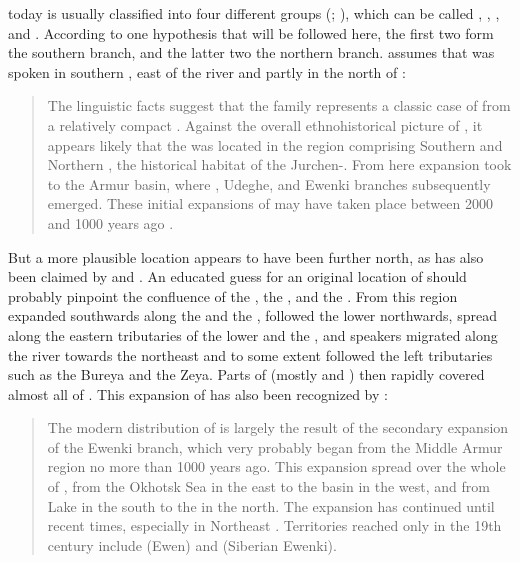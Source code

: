  today is usually classified into four different groups (\citealt{Ikegami1974}; \citealt{Georg2004}), which can be called , , , and  \citep{Janhunen2012b}. According to one hypothesis that will be followed here, the first two form the southern  branch, and the latter two the northern branch. \cite{Janhunen1996,Janhunen2005,Janhunen2012b} assumes that  was spoken in southern , east of the  river and partly in the north of :

\begin{quote}
The linguistic facts suggest that the  family represents a classic case of  from a relatively compact . Against the overall ethnohistorical picture of , it appears likely that the   was located in the region comprising Southern  and Northern , the historical habitat of the Jurchen-. From here  expansion took  to the Armur basin, where , Udeghe, and Ewenki branches subsequently emerged. These initial expansions of  may have taken place between 2000 and 1000 years ago \citep[216-233]{Janhunen1996}. \citep[39]{Janhunen2005}
\end{quote}

\noindent But a more plausible location appears to have been further north, as has also been claimed by \citet{Pevnov2012} and \citet{Vovin2013a}. An educated guess for an original location of  should probably pinpoint the confluence of the , the , and the . From this region  expanded southwards along the  and the ,  followed the lower  northwards,  spread along the eastern tributaries of the lower  and the , and  speakers migrated along the  river towards the northeast and to some extent followed the left tributaries such as the Bureya and the Zeya. Parts of  (mostly  and ) then rapidly covered almost all of . This expansion of  has also been recognized by \citet[39]{Janhunen2005}:

\begin{quote}
The modern distribution of  is largely the result of the secondary expansion of the Ewenki branch, which very probably began from the Middle Armur region no more than 1000 years ago. This expansion spread  over the whole of , from the Okhotsk Sea in the east to the  basin in the west, and from Lake  in the south to the  in the north. The expansion has continued until recent times, especially in Northeast . Territories reached only in the 19th century include  (Ewen) and  (Siberian Ewenki).
\end{quote}

